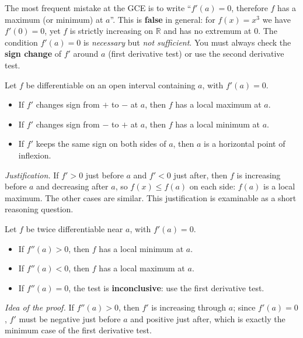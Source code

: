 \documentclass[11pt]{article}
\newcommand{\cle}[1]{{\popxbold\color{popdark}#1}}
\begin{document}
\begin{attention}[$f'(a)=0$ does not guarantee an extremum]
The most frequent mistake at the GCE is to write ``$f'(a)=0$, therefore $f$ has a maximum (or minimum) at $a$''. This is \textbf{false} in general: for $f(x)=x^3$ we have $f'(0)=0$, yet $f$ is strictly increasing on $\mathbb{R}$ and has no extremum at $0$. The condition $f'(a)=0$ is \emph{necessary} but \emph{not sufficient}. You must always check the \textbf{sign change} of $f'$ around $a$ (first derivative test) or use the second derivative test.
\end{attention}

\begin{propriete}
Let $f$ be differentiable on an open interval containing $a$, with $f'(a)=0$.
\begin{itemize}
\item If $f'$ changes sign from $+$ to $-$ at $a$, then $f$ has a \cle{local maximum} at $a$.
\item If $f'$ changes sign from $-$ to $+$ at $a$, then $f$ has a \cle{local minimum} at $a$.
\item If $f'$ keeps the same sign on both sides of $a$, then $a$ is a \cle{horizontal point of inflexion}.
\end{itemize}
\emph{Justification.} If $f'>0$ just before $a$ and $f'<0$ just after, then $f$ is increasing before $a$ and decreasing after $a$, so $f(x)\leq f(a)$ on each side: $f(a)$ is a local maximum. The other cases are similar. This justification is examinable as a short reasoning question.
\end{propriete}

\begin{propriete}
Let $f$ be twice differentiable near $a$, with $f'(a)=0$.
\begin{itemize}
\item If $f''(a)>0$, then $f$ has a \cle{local minimum} at $a$.
\item If $f''(a)<0$, then $f$ has a \cle{local maximum} at $a$.
\item If $f''(a)=0$, the test is \textbf{inconclusive}: use the first derivative test.
\end{itemize}
\emph{Idea of the proof.} If $f''(a)>0$, then $f'$ is increasing through $a$; since $f'(a)=0$, $f'$ must be negative just before $a$ and positive just after, which is exactly the minimum case of the first derivative test.
\end{propriete}
\end{document}
